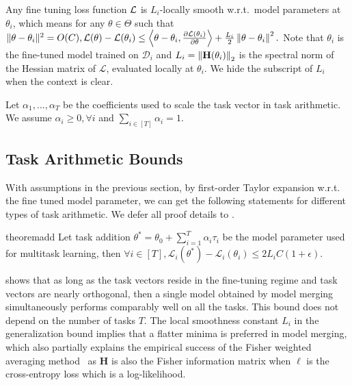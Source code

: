 \begin{assumption}
    Any fine tuning loss function ${\cal L}$ is $L_i$-locally smooth w.r.t.\ model parameters at $\theta_i$, which means for any $\theta \in \Theta$ such that $\|\theta - \theta_i\|^2 = O(C), \mathcal{L}(\theta) - \mathcal{L}(\theta_i) \leq \left<\theta - \theta_i, \frac{\partial{\mathcal{L}(\theta_i)}}{\partial\theta}\right> + \frac{L_i}{2}\left\lVert\theta - \theta_i\right\rVert^2.$
    Note that $\theta_i$ is the fine-tuned model trained on $\mathcal{D}_i$ and $L_i = \left\lVert\mathbf{H}(\theta_i)\right\rVert_2$ is the spectral norm of the Hessian matrix of $\mathcal{L}$, evaluated locally at $\theta_i$. We hide the subscript of $L_i$ when the context is clear.
\end{assumption}

\begin{assumption}[Coefficients]
\label{ass:coeff}
    Let $\alpha_1, \dots, \alpha_T$ be the coefficients used to scale the task vector in task arithmetic. We assume $\alpha_i \geq 0, \forall i$ and $\sum_{i\in[T]}\alpha_i = 1$.
\end{assumption}


\subsection{Task Arithmetic Bounds}
\label{sec:bounds}
With assumptions in the previous section, by first-order Taylor expansion w.r.t. the fine tuned model parameter, we can get the following statements for different types of task arithmetic. We defer all proof details to .

\begin{restatable}{theorem}{add}
    Let task addition $\theta^* = \theta_0 + \sum_{i=1}^T\alpha_i\tau_i$ be the model parameter used for multitask learning, then $\forall i\in[T], \mathcal{L}_i(\theta^*) - \mathcal{L}_i(\theta_i) \leq 2L_iC(1 + \epsilon).$
\label{thm:task-addition}
\end{restatable}
 shows that as long as the task vectors reside in the fine-tuning regime and task vectors are nearly orthogonal, then a single model obtained by model merging simultaneously performs comparably well on all the tasks. This bound does not depend on the number of tasks $T$. The local smoothness constant $L_i$ in the generalization bound implies that a flatter minima is preferred in model merging, which also partially explains the empirical success of the Fisher weighted averaging method~\citep{matena2022merging} as $\mathbf{H}$ is also the Fisher information matrix when $\ell$ is the cross-entropy loss which is a log-likelihood.

